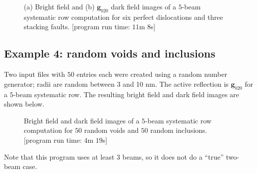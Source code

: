 \documentclass[11pt]{article}
\begin{document}
\begin{figure}[ht]
\centering\leavevmode
{}
\caption{\label{fig:combo}(a) Bright field and (b) $\mathbf{g}_{020}$ dark field images of a $5$-beam systematic row computation for six perfect dislocations and three stacking faults. [program run time: $11$m $8$s]}
\end{figure}

\newpage
\subsection{Example 4: random voids and inclusions}
Two input files with $50$ entries each were created using a random number generator; radii are random between 3 and 10 nm.  The active reflection is $\mathbf{g}_{020}$ for a $5$-beam systematic
row.  The resulting bright field and dark field images are shown below.

\begin{figure}[ht]
\centering\leavevmode
{}
\caption{\label{fig:vandi}Bright field and dark field images of a $5$-beam systematic row computation for $50$ random voids and $50$ random inclusions. [program run time: $4$m $19$s]}
\end{figure}

Note that this program uses at least 3 beams, so it does not do a ``true'' two-beam case.
\end{document}
